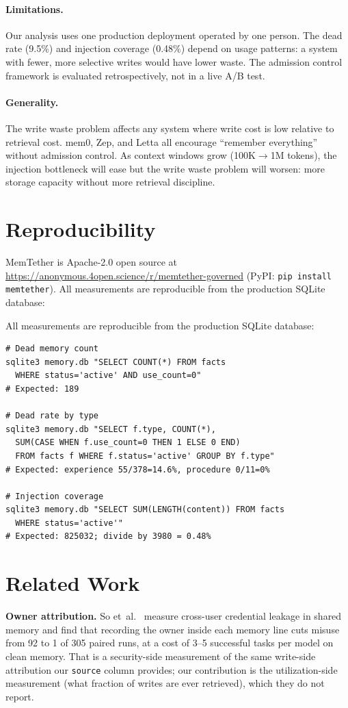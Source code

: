 \documentclass[10pt,twocolumn]{article}
\begin{document}
\paragraph{Limitations.} Our analysis uses one production deployment operated by one person. The dead rate (9.5\%) and injection coverage (0.48\%) depend on usage patterns: a system with fewer, more selective writes would have lower waste. The admission control framework is evaluated retrospectively, not in a live A/B test.

\paragraph{Generality.} The write waste problem affects any system where write cost is low relative to retrieval cost. mem0, Zep, and Letta all encourage ``remember everything'' without admission control. As context windows grow (100K$\to$1M tokens), the injection bottleneck will ease but the write waste problem will worsen: more storage capacity without more retrieval discipline.

\section{Reproducibility}

MemTether is Apache-2.0 open source at \url{https://anonymous.4open.science/r/memtether-governed} (PyPI: \texttt{pip install memtether}). All measurements are reproducible from the production SQLite database:

All measurements are reproducible from the production SQLite database:

\begin{verbatim}
# Dead memory count
sqlite3 memory.db "SELECT COUNT(*) FROM facts 
  WHERE status='active' AND use_count=0"
# Expected: 189

# Dead rate by type
sqlite3 memory.db "SELECT f.type, COUNT(*), 
  SUM(CASE WHEN f.use_count=0 THEN 1 ELSE 0 END) 
  FROM facts f WHERE f.status='active' GROUP BY f.type"
# Expected: experience 55/378=14.6%, procedure 0/11=0%

# Injection coverage
sqlite3 memory.db "SELECT SUM(LENGTH(content)) FROM facts 
  WHERE status='active'"
# Expected: 825032; divide by 3980 = 0.48%
\end{verbatim}

\section{Related Work}
\textbf{Owner attribution.} So et~al.~\cite{whosecred} measure cross-user credential leakage in shared
memory and find that recording the owner inside each memory line cuts misuse from 92 to 1 of 305 paired
runs, at a cost of 3--5 successful tasks per model on clean memory. That is a security-side measurement
of the same write-side attribution our \texttt{source} column provides; our contribution is the
utilization-side measurement (what fraction of writes are ever retrieved), which they do not report.
\end{document}
